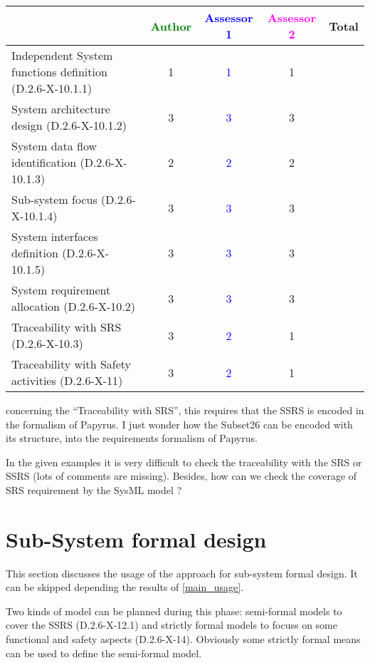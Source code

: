 \begin{tabular}{|l | c | c | c | c|}
\hline
& \textcolor{green}{Author} & \textcolor{blue}{Assessor 1} & \textcolor{magenta}{Assessor 2} & Total \\
\hline
Independent System functions definition (D.2.6-X-10.1.1) & 1 & \textcolor{blue}{1} & 1 & \\
\hline
System architecture design (D.2.6-X-10.1.2) & 3 & \textcolor{blue}{3} & 3  & \\
\hline
System data flow identification (D.2.6-X-10.1.3) & 2 & \textcolor{blue}{2} & 2 & \\
\hline
Sub-system focus (D.2.6-X-10.1.4) & 3 & \textcolor{blue}{3} & 3 & \\
\hline
System interfaces definition (D.2.6-X-10.1.5) & 3 & \textcolor{blue}{3} & 3 & \\
\hline
System requirement allocation (D.2.6-X-10.2) & 3 & \textcolor{blue}{3} & 3 & \\
\hline
Traceability with SRS (D.2.6-X-10.3) & 3 & \textcolor{blue}{2} & 1 & \\
\hline
Traceability with Safety activities (D.2.6-X-11) & 3 & \textcolor{blue}{2} & 1 & \\
\hline
\end{tabular}

\begin{assessor1}
concerning the "`Traceability with SRS"', this requires that the SSRS is encoded in the formalism of Papyrus. I just wonder how the Subset26 can be encoded with its structure, into the requirements formalism of Papyrus. 
\end{assessor1}


\begin{assessor2}
In the given examples it is very difficult to check the traceability with the SRS or SSRS (lots of comments are missing). Besides, how can we check the coverage of SRS requirement by the SysML model ?
\end{assessor2}



\section{Sub-System formal design}
This section discusses the usage of the approach for sub-system formal design.
It can be skipped depending the results of \ref{main_usage}.

Two kinds of model can be planned during this phase: semi-formal models to cover the SSRS (D.2.6-X-12.1) and strictly formal models to focuss on some functional and safety aspects (D.2.6-X-14). Obviously some strictly formal means can be used to define the semi-formal model.

